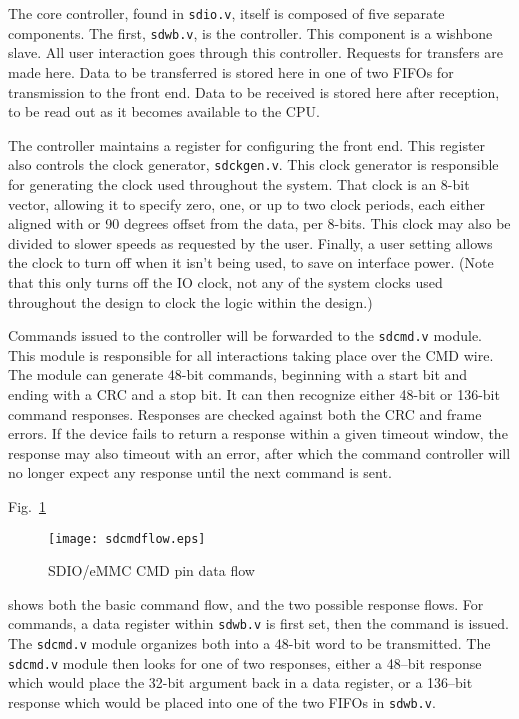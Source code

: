 \documentclass{gqtekspec}
\begin{document}
The core controller, found in {\tt sdio.v}, itself is composed of five separate
components.  The first, {\tt sdwb.v}, is the controller.  This component is
a wishbone slave.  All user interaction goes through this controller.
Requests for transfers are made here.  Data to be transferred is stored here
in one of two FIFOs for transmission to the front end.  Data to be received
is stored here after reception, to be read out as it becomes available to the
CPU.

The controller maintains a register for configuring the front end.  This
register also controls the clock generator, {\tt sdckgen.v}.  This clock
generator is responsible for generating the clock used throughout the
system.  That clock is an 8-bit vector, allowing it to specify zero, one, or up
to two clock periods, each either aligned with or 90 degrees offset from the
data, per 8-bits.  This clock may also be divided to slower speeds as requested
by the user.  Finally, a user setting allows the clock to turn off when it isn't
being used, to save on interface power.  (Note that this only turns off the
IO clock, not any of the system clocks used throughout the design to clock
the logic within the design.)

Commands issued to the controller will be forwarded to the {\tt sdcmd.v}
module.  This module is responsible for all interactions taking place over
the CMD wire.  The module can generate 48-bit commands, beginning with a
start bit and ending with a CRC and a stop bit.  It can then recognize
either 48-bit or 136-bit command responses.  Responses are checked against
both the CRC and frame errors.  If the device fails to return a response
within a given timeout window, the response may also timeout with an error,
after which the command controller will no longer expect any response until
the next command is sent.

Fig.~\ref{fig:sdcmdflow}
\begin{figure}\begin{center}
\texttt{[image: sdcmdflow.eps]}
\caption{SDIO/eMMC CMD pin data flow}\label{fig:sdcmdflow}
\end{center}\end{figure}
shows both the basic command flow, and the two possible response flows.
For commands, a data register within {\tt sdwb.v} is first set, then the
command is issued.  The {\tt sdcmd.v} module organizes both into a 48-bit
word to be transmitted.  The {\tt sdcmd.v} module then looks for one of
two responses, either a 48--bit response which would place the 32-bit
argument back in a data register, or a 136--bit response which would be
placed into one of the two FIFOs in {\tt sdwb.v}.
\end{document}
